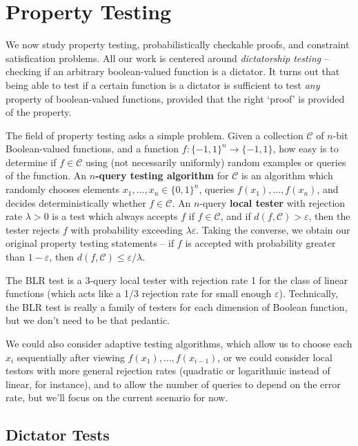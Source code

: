 \chapter{Property Testing}

We now study property testing, probabilistically checkable proofs, and constraint satisfication problems. All our work is centered around {\it dictatorship testing} -- checking if an arbitrary boolean-valued function is a dictator. It turns out that being able to test if a certain function is a dictator is sufficient to test {\it any} property of boolean-valued functions, provided that the right `proof' is provided of the property.

The field of property testing asks a simple problem. Given a collection $\mathcal{C}$ of $n$-bit Boolean-valued functions, and a function $f: \{ -1, 1 \}^n \to \{ -1, 1 \}$, how easy is to determine if $f \in \mathcal{C}$ using (not necessarily uniformly) random examples or queries of the function. An {\bf $n$-query testing algorithm} for $\mathcal{C}$ is an algorithm which randomly chooses elements $x_1, \dots, x_n \in \{ 0, 1 \}^n$, queries $f(x_1), \dots, f(x_n)$, and decides deterministically whether $f \in \mathcal{C}$. An $n$-query {\bf local tester} with rejection rate $\lambda > 0$ is a test which always accepts $f$ if $f \in \mathcal{C}$, and if $d(f,\mathcal{C}) > \varepsilon$, then the tester rejects $f$ with probability exceeding $\lambda \varepsilon$. Taking the converse, we obtain our original property testing statements -- if $f$ is accepted with probability greater than $1 - \varepsilon$, then $d(f,\mathcal{C}) \leq \varepsilon/\lambda$.

\begin{example}
    The BLR test is a 3-query local tester with rejection rate 1 for the class of linear functions (which acts like a 1/3 rejection rate for small enough $\varepsilon$). Technically, the BLR test is really a family of testers for each dimension of Boolean function, but we don't need to be that pedantic.
\end{example}

We could also consider adaptive testing algorithms, which allow us to choose each $x_i$ sequentially after viewing $f(x_1), \dots, f(x_{i-1})$, or we could consider local testors with more general rejection rates (quadratic or logarithmic instead of linear, for instance), and to allow the number of queries to depend on the error rate, but we'll focus on the current scenario for now.

\section{Dictator Tests}

